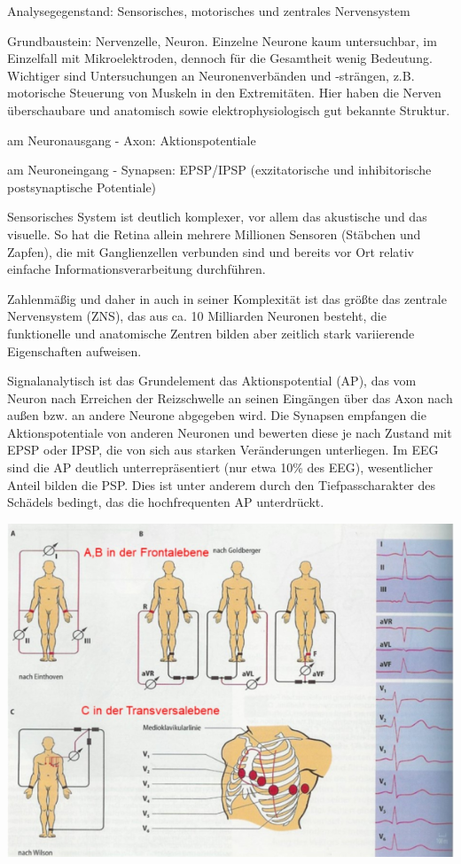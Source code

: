 \documentclass[a4paper]{article}
\begin{document}
\begin{multicols}{3}
  \begin{itemize*}
    \item Analysegegenstand: Sensorisches, motorisches und zentrales Nervensystem
    \item Grundbaustein: Nervenzelle, Neuron. Einzelne Neurone kaum untersuchbar, im Einzelfall mit Mikroelektroden, dennoch für die Gesamtheit wenig Bedeutung. Wichtiger sind Untersuchungen an Neuronenverbänden und -strängen, z.B. motorische Steuerung von Muskeln in den Extremitäten. Hier haben die Nerven überschaubare und anatomisch sowie elektrophysiologisch gut bekannte Struktur.
    \item am Neuronausgang - Axon: Aktionspotentiale
    \item am Neuroneingang - Synapsen: EPSP/IPSP (exzitatorische und inhibitorische postsynaptische Potentiale)
    \item Sensorisches System ist deutlich komplexer, vor allem das akustische und das visuelle. So hat die Retina allein mehrere Millionen Sensoren (Stäbchen und Zapfen), die mit Ganglienzellen verbunden sind und bereits vor Ort relativ einfache Informationsverarbeitung durchführen.
    \item Zahlenmäßig und daher in auch in seiner Komplexität ist das größte das zentrale Nervensystem (ZNS), das aus ca. 10 Milliarden Neuronen besteht, die funktionelle und anatomische Zentren bilden aber zeitlich stark variierende Eigenschaften aufweisen.
    \item Signalanalytisch ist das Grundelement das Aktionspotential (AP), das vom Neuron nach Erreichen der Reizschwelle an seinen Eingängen über das Axon nach außen bzw. an andere Neurone abgegeben wird. Die Synapsen empfangen die Aktionspotentiale von anderen Neuronen und bewerten diese je nach Zustand mit EPSP oder IPSP, die von sich aus starken Veränderungen unterliegen. Im EEG sind die AP deutlich unterrepräsentiert (nur etwa 10\% des EEG), wesentlicher Anteil bilden die PSP. Dies ist unter anderem durch den Tiefpasscharakter des Schädels bedingt, das die hochfrequenten AP unterdrückt.
  \end{itemize*}

  \includegraphics[width=.5\linewidth]{Assets/Biosignalverarbeitung-ekg.png}


\end{multicols}
\end{document}

